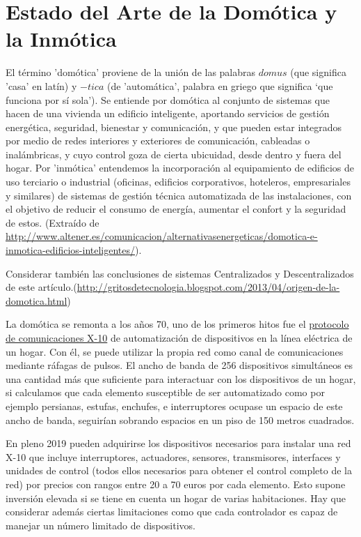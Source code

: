 \section{Estado del Arte de la Domótica y la Inmótica}
\label{makereference1.1.1}

El término 'domótica' proviene de la unión de las palabras $domus$ (que significa 'casa' en latín) y $-tica$ (de 'automática', palabra en griego que significa ‘que funciona por sí sola’). Se entiende por domótica al conjunto de sistemas que hacen de una vivienda un edificio inteligente, aportando servicios de gestión energética, seguridad, bienestar y comunicación, y que pueden estar integrados por medio de redes interiores y exteriores de comunicación, cableadas o inalámbricas, y cuyo control goza de cierta ubicuidad, desde dentro y fuera del hogar.
Por 'inmótica' entendemos la incorporación al equipamiento de edificios de uso terciario o industrial (oficinas, edificios corporativos, hoteleros, empresariales y similares) de sistemas de gestión técnica automatizada de las instalaciones, con el objetivo de reducir el consumo de energía, aumentar el confort y la seguridad de estos.
(Extraído de \url{http://www.altener.es/comunicacion/alternativasenergeticas/domotica-e-inmotica-edificios-inteligentes/}).

Considerar también las conclusiones de sistemas Centralizados y Descentralizados de este artículo.(\url{http://gritosdetecnologia.blogspot.com/2013/04/origen-de-la-domotica.html})

La domótica se remonta a los años 70, uno de los primeros hitos fue el \href{https://es.wikipedia.org/wiki/X10}{protocolo de comunicaciones X-10} de automatización de dispositivos en la línea eléctrica de un hogar. Con él, se puede utilizar la propia red como canal de comunicaciones mediante ráfagas de pulsos. El ancho de banda de 256 dispositivos simultáneos es una cantidad más que suficiente para interactuar con los dispositivos de un hogar, si calculamos que cada elemento susceptible de ser automatizado como por ejemplo persianas, estufas, enchufes, e interruptores ocupase un espacio de este ancho de banda, seguirían sobrando espacios en un piso de 150 metros cuadrados.

En pleno 2019 pueden adquirirse los dispositivos necesarios para instalar una red X-10 que incluye interruptores, actuadores, sensores, transmisores, interfaces y unidades de control (todos ellos necesarios para obtener el control completo de la red) por precios con rangos entre 20 a 70 euros por cada elemento. Esto supone inversión elevada si se tiene en cuenta un hogar de varias habitaciones. Hay que considerar además ciertas limitaciones como que cada controlador es capaz de manejar un número limitado de dispositivos.

